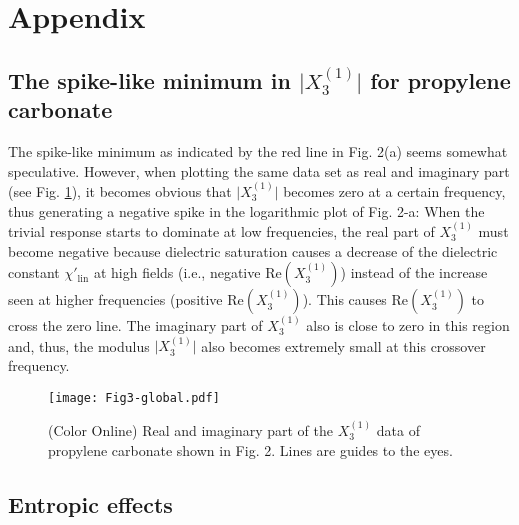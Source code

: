 \documentclass[single column,pre]{revtex4}
\begin{document}
 
\section{Appendix \label{partA}}
\subsection{The spike-like minimum in $\vert X_3^{(1)} \vert$ for propylene carbonate \label{partZ}}

The spike-like minimum as indicated by the red line in Fig. 2(a) seems somewhat speculative. However, when plotting the same data set as real and imaginary part (see Fig. \ref{fig3}), it becomes obvious that $\vert X_3^{(1)} \vert$ becomes zero at a certain frequency, thus generating a negative spike in the logarithmic plot of Fig. 2-a: When the trivial response starts to dominate at low frequencies, the real part of $X_3^{(1)}$ must become negative because dielectric saturation causes a decrease of the dielectric constant $\chi'_{\text{lin}}$ at high fields (i.e., negative $\text{Re}(X_3^{(1)})$) instead of the increase seen at higher frequencies (positive $\text{Re}(X_3^{(1)})$). This causes $\text{Re}(X_3^{(1)})$ to cross the zero line. The imaginary part of $X_3^{(1)}$ also is close to zero in this region and, thus, the modulus $\vert X_3^{(1)} \vert$ also becomes extremely small at this crossover frequency.

\begin{figure}[t] 
\texttt{[image: Fig3-global.pdf]}
\caption{(Color Online) Real and imaginary part of the $X_3^{(1)}$ data of propylene carbonate shown in Fig. 2. Lines are guides to the eyes.} 
\label{fig3}
\end{figure}


\subsection{\label{partA1} Entropic effects}
\end{document}
